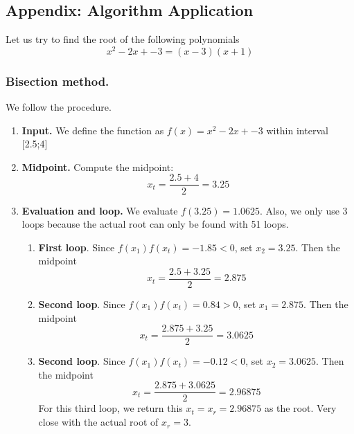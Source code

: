 \documentclass[../../../main.tex]{subfiles}
\begin{document}
\subsection{Appendix: Algorithm Application}
Let us try to find the root of the following polynomials
\begin{equation*}
    x^2- 2 x + -3  =
    \left(x-3\right)\left(x+1\right)
\end{equation*}

\subsubsection{Bisection method.}
We follow the procedure.
\begin{enumerate}
    \item \textbf{Input.} We define the function as $f(x)=x^2- 2 x + -3$ within interval [2.5;4]
    \item \textbf{Midpoint.} Compute the midpoint:
          \begin{equation*}
              x_t= \frac{2.5+4}{2}=3.25
          \end{equation*}
    \item \textbf{Evaluation and loop.} We evaluate $f(3.25)=1.0625$. Also, we only use 3 loops because the actual root can only be found with 51 loops.
          \begin{enumerate}
              \item \textbf{First loop}. Since $f(x_1)f(x_t)=-1.85<0$, set $x_2=3.25$. Then the midpoint
                    \begin{equation*}
                        x_t=\frac{2.5+3.25}{2}=2.875
                    \end{equation*}
              \item \textbf{Second loop}. Since $f(x_1)f(x_t)=0.84>0$, set $x_1=2.875$. Then the midpoint
                    \begin{equation*}
                        x_t=\frac{2.875+3.25 }{2}=3.0625
                    \end{equation*}
              \item \textbf{Second loop}. Since $f(x_1)f(x_t)=-0.12<0$, set $x_2=3.0625$. Then the midpoint
                    \begin{equation*}
                        x_t=\frac{2.875+3.0625}{2}=2.96875
                    \end{equation*}
                    For this third loop, we return this $x_t=x_r=2.96875$ as the root. Very close with the actual root of $x_r=3$.
          \end{enumerate}
\end{enumerate}
\end{document}
